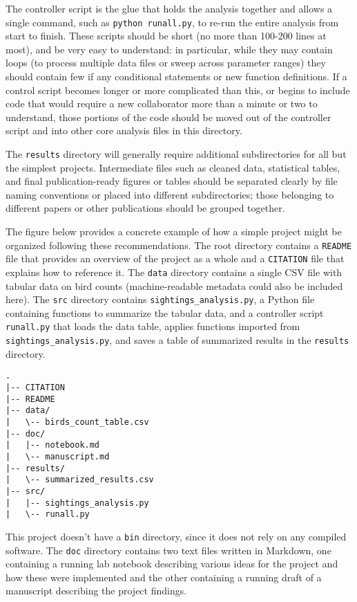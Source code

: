\documentclass[10pt]{article}
\begin{document}
The controller script is the glue that holds the analysis together and
allows a single command, such as \texttt{python runall.py}, to re-run
the entire analysis from start to finish. These scripts should be short
(no more than 100-200 lines at most), and be very easy to understand: in
particular, while they may contain loops (to process multiple data files
or sweep across parameter ranges) they should contain few if any
conditional statements or new function definitions. If a control script
becomes longer or more complicated than this, or begins to include code
that would require a new collaborator more than a minute or two to
understand, those portions of the code should be moved out of the
controller script and into other core analysis files in this directory.

The \texttt{results} directory will generally require additional
subdirectories for all but the simplest projects. Intermediate files
such as cleaned data, statistical tables, and final publication-ready
figures or tables should be separated clearly by file naming conventions
or placed into different subdirectories; those belonging to different
papers or other publications should be grouped together.

The figure below provides a concrete example of how a simple project
might be organized following these recommendations. The root directory
contains a \texttt{README} file that provides an overview of the
project as a whole and a \texttt{CITATION} file that explains how to
reference it. The \texttt{data} directory contains a single CSV file
with tabular data on bird counts (machine-readable metadata could also
be included here). The \texttt{src} directory contains
\texttt{sightings\_analysis.py}, a Python file containing functions to
summarize the tabular data, and a controller script \texttt{runall.py}
that loads the data table, applies functions imported from
\texttt{sightings\_analysis.py}, and saves a table of summarized
results in the \texttt{results} directory.

\begin{verbatim}
.
|-- CITATION
|-- README
|-- data/
|   \-- birds_count_table.csv
|-- doc/
|   |-- notebook.md
|   \-- manuscript.md
|-- results/
|   \-- summarized_results.csv
|-- src/
|   |-- sightings_analysis.py
|   \-- runall.py
\end{verbatim}

This project doesn't have a \texttt{bin} directory, since it does not
rely on any compiled software. The \texttt{doc} directory contains two
text files written in Markdown, one containing a running lab notebook
describing various ideas for the project and how these were implemented
and the other containing a running draft of a manuscript describing the
project findings.
\end{document}
